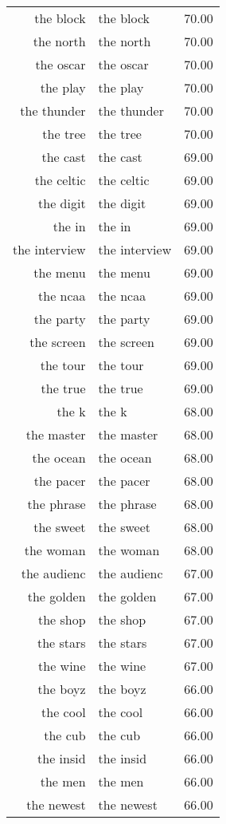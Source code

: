 \begin{table}[ht]
\begin{tabular}{rlr}
  the block & the block & 70.00 \\ 
  the north & the north & 70.00 \\ 
  the oscar & the oscar & 70.00 \\ 
  the play & the play & 70.00 \\ 
  the thunder & the thunder & 70.00 \\ 
  the tree & the tree & 70.00 \\ 
  the cast & the cast & 69.00 \\ 
  the celtic & the celtic & 69.00 \\ 
  the digit & the digit & 69.00 \\ 
  the in & the in & 69.00 \\ 
  the interview & the interview & 69.00 \\ 
  the menu & the menu & 69.00 \\ 
  the ncaa & the ncaa & 69.00 \\ 
  the party & the party & 69.00 \\ 
  the screen & the screen & 69.00 \\ 
  the tour & the tour & 69.00 \\ 
  the true & the true & 69.00 \\ 
  the k & the k & 68.00 \\ 
  the master & the master & 68.00 \\ 
  the ocean & the ocean & 68.00 \\ 
  the pacer & the pacer & 68.00 \\ 
  the phrase & the phrase & 68.00 \\ 
  the sweet & the sweet & 68.00 \\ 
  the woman & the woman & 68.00 \\ 
  the audienc & the audienc & 67.00 \\ 
  the golden & the golden & 67.00 \\ 
  the shop & the shop & 67.00 \\ 
  the stars & the stars & 67.00 \\ 
  the wine & the wine & 67.00 \\ 
  the boyz & the boyz & 66.00 \\ 
  the cool & the cool & 66.00 \\ 
  the cub & the cub & 66.00 \\ 
  the insid & the insid & 66.00 \\ 
  the men & the men & 66.00 \\ 
  the newest & the newest & 66.00 \\ 

\end{tabular}
\end{table}
